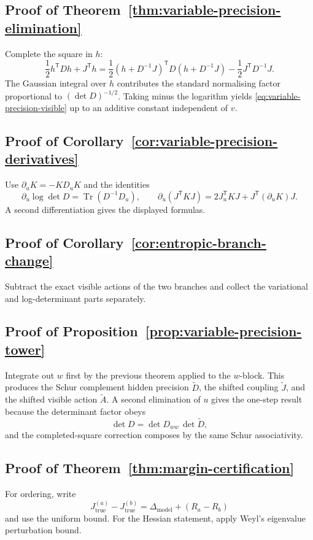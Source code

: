 \documentclass[11pt,a4paper]{article}
\numberwithin{equation}{section}
\DeclareMathOperator{\Tr}{Tr}
\theoremstyle{thmcompact}
\theoremstyle{remark}
\begin{document}
\subsection*{Proof of Theorem~\ref{thm:variable-precision-elimination}}
Complete the square in $h$:
\begin{equation}
\frac12 h^{\mathsf T}Dh+J^{\mathsf T}h
=
\frac12(h+D^{-1}J)^{\mathsf T}D(h+D^{-1}J)-\frac12J^{\mathsf T}D^{-1}J.
\end{equation}
The Gaussian integral over $h$ contributes the standard normalising factor proportional to $(\det D)^{-1/2}$. Taking minus the logarithm yields \eqref{eq:variable-precision-visible} up to an additive constant independent of $v$.

\subsection*{Proof of Corollary~\ref{cor:variable-precision-derivatives}}
Use $\partial_uK=-KD_uK$ and the identities
\begin{equation}
\partial_u\log\det D=\Tr(D^{-1}D_u),
\qquad
\partial_u(J^{\mathsf T}KJ)=2J_u^{\mathsf T}KJ+J^{\mathsf T}(\partial_uK)J.
\end{equation}
A second differentiation gives the displayed formulas.

\subsection*{Proof of Corollary~\ref{cor:entropic-branch-change}}
Subtract the exact visible actions of the two branches and collect the variational and log-determinant parts separately.

\subsection*{Proof of Proposition~\ref{prop:variable-precision-tower}}
Integrate out $w$ first by the previous theorem applied to the $w$-block. This produces the Schur complement hidden precision $\widetilde D$, the shifted coupling $\widetilde J$, and the shifted visible action $\widetilde A$. A second elimination of $u$ gives the one-step result because the determinant factor obeys
\begin{equation}
\det D=\det D_{ww}\,\det \widetilde D,
\end{equation}
and the completed-square correction composes by the same Schur associativity.

\subsection*{Proof of Theorem~\ref{thm:margin-certification}}
For ordering, write
\begin{equation}
J_{\mathrm{true}}^{(a)}-J_{\mathrm{true}}^{(b)}=\Delta_{\mathrm{model}}+(R_a-R_b)
\end{equation}
and use the uniform bound. For the Hessian statement, apply Weyl's eigenvalue perturbation bound.
\end{document}

